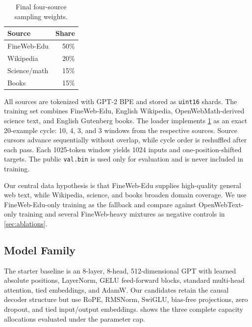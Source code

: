 \documentclass{article}
\begin{document}
\begin{table}
  \vspace{-0.7\baselineskip}
  \caption{Final four-source sampling weights.}
  \label{tab:data-mixture}
  \centering
  \small
  \setlength{\tabcolsep}{4pt}
  \begin{tabular}{@{}lr@{}}
    \toprule
    Source & Share \\
    \midrule
    FineWeb-Edu & 50\% \\
    Wikipedia & 20\% \\
    Science/math & 15\% \\
    Books & 15\% \\
    \bottomrule
  \end{tabular}
\end{table}

All sources are tokenized with GPT-2 BPE and stored as \texttt{uint16} shards.
The training set combines FineWeb-Edu, English Wikipedia, OpenWebMath-derived
science text, and English Gutenberg books. The loader implements
\cref{tab:data-mixture} as an exact 20-example cycle: 10, 4, 3, and 3 windows
from the respective sources. Source cursors advance sequentially without
overlap, while cycle order is reshuffled after each pass. Each 1025-token
window yields 1024 inputs and one-position-shifted targets. The public
\texttt{val.bin} is used only for evaluation and is never included in
training.

Our central data hypothesis is that FineWeb-Edu supplies high-quality general
web text, while Wikipedia, science, and books broaden domain coverage. We use
FineWeb-Edu-only training as the fallback and compare against OpenWebText-only
training and several FineWeb-heavy mixtures as negative controls in
\cref{sec:ablations}.

\subsection{Model Family}

The starter baseline is an 8-layer, 8-head, 512-dimensional GPT with learned
absolute positions, LayerNorm, GELU feed-forward blocks, standard multi-head
attention, tied embeddings, and AdamW. Our candidates retain the causal
decoder structure but use RoPE, RMSNorm, SwiGLU, bias-free projections, zero
dropout, and tied input/output embeddings.  shows the
three complete capacity allocations evaluated under the parameter cap.
\end{document}
